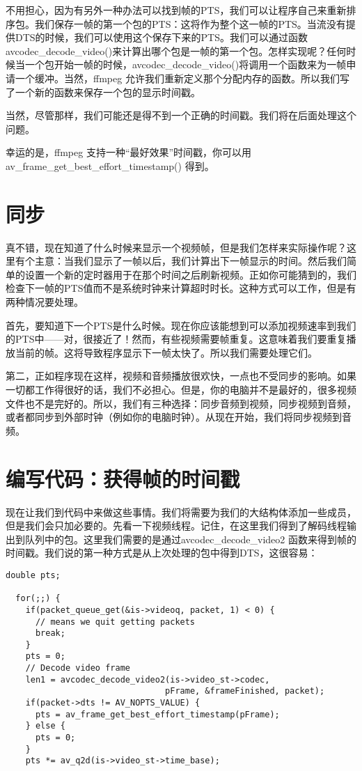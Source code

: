 不用担心，因为有另外一种办法可以找到帧的PTS，我们可以让程序自己来重新排序包。我们保存一帧的第一个包的PTS：这将作为整个这一帧的PTS。当流没有提供DTS的时候，我们可以使用这个保存下来的PTS。我们可以通过函数avcodec_decode_video()来计算出哪个包是一帧的第一个包。怎样实现呢？任何时候当一个包开始一帧的时候，avcodec_decode_video()将调用一个函数来为一帧申请一个缓冲。当然，ffmpeg 允许我们重新定义那个分配内存的函数。所以我们写了一个新的函数来保存一个包的显示时间戳。

当然，尽管那样，我们可能还是得不到一个正确的时间戳。我们将在后面处理这个问题。

幸运的是，ffmpeg 支持一种“最好效果”时间戳，你可以用 av_frame_get_best_effort_timestamp() 得到。

\section{同步}

真不错，现在知道了什么时候来显示一个视频帧，但是我们怎样来实际操作呢？这里有个主意：当我们显示了一帧以后，我们计算出下一帧显示的时间。然后我们简单的设置一个新的定时器用于在那个时间之后刷新视频。正如你可能猜到的，我们检查下一帧的PTS值而不是系统时钟来计算超时时长。这种方式可以工作，但是有两种情况要处理。

首先，要知道下一个PTS是什么时候。现在你应该能想到可以添加视频速率到我们的PTS中——对，很接近了！然而，有些视频需要帧重复。这意味着我们要重复播放当前的帧。这将导致程序显示下一帧太快了。所以我们需要处理它们。

第二，正如程序现在这样，视频和音频播放很欢快，一点也不受同步的影响。如果一切都工作得很好的话，我们不必担心。但是，你的电脑并不是最好的，很多视频文件也不是完好的。所以，我们有三种选择：同步音频到视频，同步视频到音频，或者都同步到外部时钟（例如你的电脑时钟）。从现在开始，我们将同步视频到音频。
\section{编写代码：获得帧的时间戳}
现在让我们到代码中来做这些事情。我们将需要为我们的大结构体添加一些成员，但是我们会只加必要的。先看一下视频线程。记住，在这里我们得到了解码线程输出到队列中的包。这里我们需要的是通过avcodec_decode_video2 函数来得到帧的时间戳。我们说的第一种方式是从上次处理的包中得到DTS，这很容易：

\begin{lstlisting}
double pts;

  for(;;) {
    if(packet_queue_get(&is->videoq, packet, 1) < 0) {
      // means we quit getting packets
      break;
    }
    pts = 0;
    // Decode video frame
    len1 = avcodec_decode_video2(is->video_st->codec,
                                pFrame, &frameFinished, packet);
    if(packet->dts != AV_NOPTS_VALUE) {
      pts = av_frame_get_best_effort_timestamp(pFrame);
    } else {
      pts = 0;
    }
    pts *= av_q2d(is->video_st->time_base);
\end{lstlisting}

